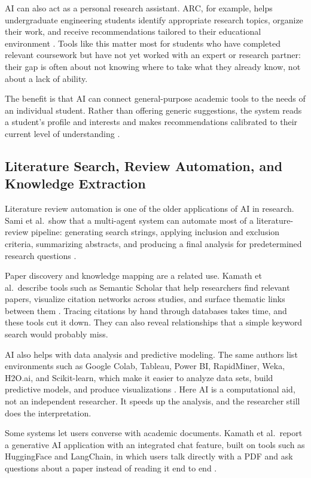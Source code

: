 \documentclass[sn-basic,Numbered]{sn-jnl}
\begin{document}
AI can also act as a personal research assistant. ARC, for example,
helps undergraduate engineering students identify appropriate research
topics, organize their work, and receive recommendations tailored to
their educational environment \cite{vishnumolakala2024arc}. Tools like
this matter most for students who have completed relevant coursework
but have not yet worked with an expert or research partner: their gap
is often about not knowing where to take what they already know, not
about a lack of ability.

The benefit is that AI can connect general-purpose academic tools to
the needs of an individual student. Rather than offering generic
suggestions, the system reads a student's profile and interests and
makes recommendations calibrated to their current level of
understanding \cite{vishnumolakala2024arc}.

\subsection{Literature Search, Review Automation, and Knowledge
Extraction}

Literature review automation is one of the older applications of AI in
research. Sami et al.\ show that a multi-agent system can automate most
of a literature-review pipeline: generating search strings, applying
inclusion and exclusion criteria, summarizing abstracts, and producing a
final analysis for predetermined research questions \cite{sami2025slr}.

Paper discovery and knowledge mapping are a related use. Kamath et
al.\ describe tools such as Semantic Scholar that help researchers find
relevant papers, visualize citation networks across studies, and surface
thematic links between them \cite{kamath2025academic}. Tracing citations
by hand through databases takes time, and these tools cut it down. They
can also reveal relationships that a simple keyword search would
probably miss.

AI also helps with data analysis and predictive modeling. The same
authors list environments such as Google Colab, Tableau, Power BI,
RapidMiner, Weka, H2O.ai, and Scikit-learn, which make it easier to
analyze data sets, build predictive models, and produce visualizations
\cite{kamath2025academic}. Here AI is a computational aid, not an
independent researcher. It speeds up the analysis, and the researcher
still does the interpretation.

Some systems let users converse with academic documents. Kamath et
al.\ report a generative AI application with an integrated chat feature,
built on tools such as HuggingFace and LangChain, in which users talk
directly with a PDF and ask questions about a paper instead of reading
it end to end \cite{kamath2025academic}.
\end{document}
